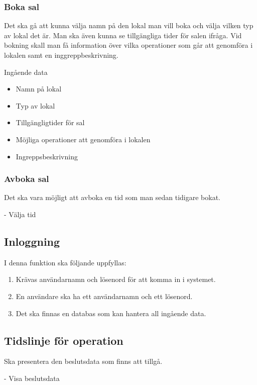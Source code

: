 \documentclass[a4paper,10pt]{article}
\begin{document}
\subsubsection{Boka sal}
Det ska gå att kunna välja namn på den lokal man vill boka och välja vilken typ av lokal det är. Man ska även kunna se tillgängliga tider för salen ifråga. Vid bokning skall man få information över vilka operationer som går att genomföra i lokalen samt en inggreppbeskrivning.

Ingående data
\begin{multicols}{2}
\begin{itemize}
	\item Namn på lokal
	\item Typ av lokal
	\item Tillgängligtider för sal
	\item Möjliga operationer att genomföra i lokalen
	\item Ingreppsbeskrivning
\end{itemize}
\end{multicols}

\subsubsection{Avboka sal}

Det ska vara möjligt att avboka en tid som man sedan tidigare bokat.

-	Välja tid

\subsection{Inloggning}
I denna funktion ska följande uppfyllas: 
\begin{enumerate}
	\item Krävas användarnamn och lösenord för att komma in i systemet.
    \item En användare ska ha ett användarnamn och ett lösenord.
    \item Det ska finnas en databas som kan hantera all ingående data.
\end{enumerate}    

\subsection{Tidslinje för operation}

Ska presentera den beslutsdata som finns att tillgå.

-	Visa beslutsdata
\end{document}
